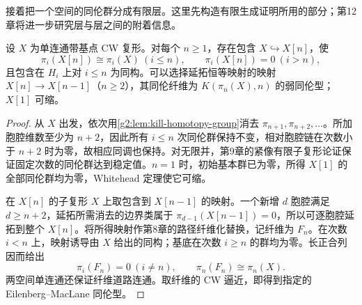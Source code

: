 接着把一个空间的同伦群分成有限层。这里先构造有限生成证明所用的部分；第12章将进一步研究层与层之间的附着信息。

\begin{lemma}\label{g2:lem:finite-homotopy-truncations}
	设 \(X\) 为单连通带基点 CW 复形。对每个 \(n\ge1\)，存在包含 \(X\hookrightarrow X[n]\)，使
	\[
		\pi_i(X[n])\cong\pi_i(X)\ (i\le n),\qquad \pi_i(X[n])=0\ (i>n),
	\]
	且包含在 \(H_i\) 上对 \(i\le n\) 为同构。可以选择延拓恒等映射的映射 \(X[n]\to X[n-1]\)（\(n\ge2\)），其同伦纤维为 \(K(\pi_n(X),n)\) 的弱同伦型；\(X[1]\) 可缩。
\end{lemma}
\begin{proof}
	从 \(X\) 出发，依次用\cref{g2:lem:kill-homotopy-group}消去 \(\pi_{n+1},\pi_{n+2},\ldots\)。所加胞腔维数至少为 \(n+2\)，因此所有 \(i\le n\) 次同伦群保持不变，相对胞腔链在次数小于 \(n+2\) 时为零，故相应同调也保持。对无限并，第9章的紧像有限子复形论证保证固定次数的同伦群达到稳定值。\(n=1\) 时，初始基本群已为零，所得 \(X[1]\) 的全部同伦群均为零，Whitehead 定理使它可缩。

	在 \(X[n]\) 的子复形 \(X\) 上取包含到 \(X[n-1]\) 的映射。一个新增 \(d\) 胞腔满足 \(d\ge n+2\)，延拓所需消去的边界类属于 \(\pi_{d-1}(X[n-1])=0\)，所以可逐胞腔延拓到整个 \(X[n]\)。将所得映射作第8章的路径纤维化替换，记纤维为 \(F_n\)。在次数 \(i<n\) 上，映射诱导由 \(X\) 给出的同构；基底在次数 \(i\ge n\) 的群均为零。长正合列因而给出
	\[
		\pi_i(F_n)=0\ (i\ne n),\qquad \pi_n(F_n)\cong\pi_n(X).
	\]
	两空间单连通还保证纤维道路连通。取纤维的 CW 逼近，即得到指定的 Eilenberg–MacLane 同伦型。
\end{proof}

